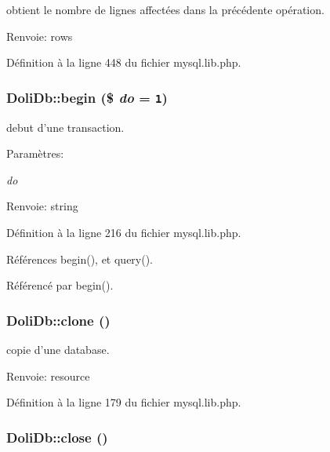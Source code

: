 obtient le nombre de lignes affect\'{e}es dans la pr\'{e}c\'{e}dente op\'{e}ration. 

\begin{Desc}
\item[Renvoie:]rows \end{Desc}


D\'{e}finition \`{a} la ligne 448 du fichier mysql.lib.php.\hypertarget{classDoliDb_a7}{
\subsubsection[begin]{\setlength{\rightskip}{0pt plus 5cm}Doli\-Db::begin (\$ {\em do} = {\tt 1})}}
\label{classDoliDb_a7}


debut d'une transaction. 

\begin{Desc}
\item[Param\`{e}tres:]
\begin{description}
\item[{\em do}]\end{description}
\end{Desc}
\begin{Desc}
\item[Renvoie:]string \end{Desc}


D\'{e}finition \`{a} la ligne 216 du fichier mysql.lib.php.

R\'{e}f\'{e}rences begin(), et query().

R\'{e}f\'{e}renc\'{e} par begin().\hypertarget{classDoliDb_a4}{
\subsubsection[clone]{\setlength{\rightskip}{0pt plus 5cm}Doli\-Db::clone ()}}
\label{classDoliDb_a4}


copie d'une database. 

\begin{Desc}
\item[Renvoie:]resource \end{Desc}


D\'{e}finition \`{a} la ligne 179 du fichier mysql.lib.php.\hypertarget{classDoliDb_a6}{
\subsubsection[close]{\setlength{\rightskip}{0pt plus 5cm}Doli\-Db::close ()}}
\label{classDoliDb_a6}


